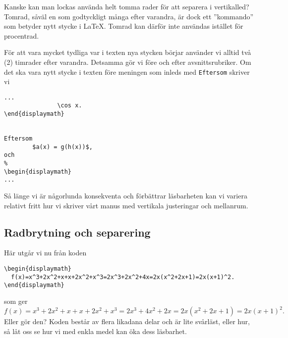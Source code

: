 \documentclass[a4paper,12pt]{article}
\begin{document}
Kanske kan man lockas använda helt tomma rader för att separera i
vertikalled? Tomrad, såväl en som godtyckligt många efter varandra,
är dock ett ''kommando'' som betyder nytt stycke i \LaTeX. Tomrad kan
därför inte användas istället för procentrad.  


För att vara mycket tydliga var i texten nya stycken börjar använder
vi alltid två (2) timrader efter varandra. Detsamma gör vi före och
efter avsnittsrubriker. Om det ska vara nytt stycke i texten före
meningen som inleds med \texttt{Eftersom} skriver vi
%
\begin{lstlisting}
...
               \cos x. 
\end{displaymath}


Eftersom 
        $a(x) = g(h(x))$, 
och 
%
\begin{displaymath}
...
\end{lstlisting}
%
Så länge vi är någorlunda konsekventa och förbättrar läsbarheten kan
vi variera relativt fritt hur vi skriver vårt manus med vertikala
justeringar och mellanrum. 


\subsection{Radbrytning och separering}


Här utgår vi nu från koden
%
\begin{lstlisting}
\begin{displaymath}
  f(x)=x^3+2x^2+x+x+2x^2+x^3=2x^3+2x^2+4x=2x(x^2+2x+1)=2x(x+1)^2.
\end{displaymath}
\end{lstlisting}
%
som ger
\begin{displaymath}
  f(x)=x^3+2x^2+x+x+2x^2+x^3=2x^3+4x^2+2x=2x(x^2+2x+1)=2x(x+1)^2.
\end{displaymath}
%
Eller gör den? Koden består av flera likadana delar och är lite
svårläst, eller hur,  så låt oss se hur vi med enkla medel kan öka
dess läsbarhet.  
\end{document}
